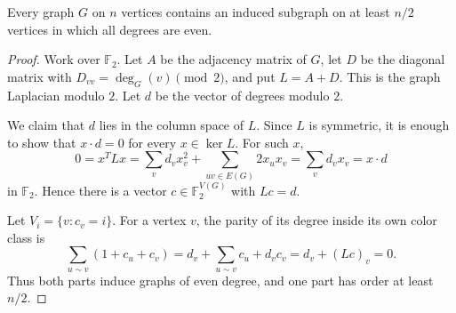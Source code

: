 \documentclass[10pt,a4paper]{amsart}
\newcommand{\F}{\mathbb{F}}
\begin{document}
\begin{lemma}\label{lem:parity}
Every graph \(G\) on \(n\) vertices contains an induced subgraph on at least \(n/2\) vertices in which all degrees are even.
\end{lemma}

\begin{proof}
Work over \(\F_2\).  Let \(A\) be the adjacency matrix of \(G\), let \(D\) be the diagonal matrix with \(D_{vv}=\deg_G(v)\pmod 2\), and put \(L=A+D\).  This is the graph Laplacian modulo \(2\).  Let \(d\) be the vector of degrees modulo \(2\).

We claim that \(d\) lies in the column space of \(L\).  Since \(L\) is symmetric, it is enough to show that \(x\cdot d=0\) for every \(x\in\ker L\).  For such \(x\),
\[
        0=x^T Lx
        =\sum_v d_vx_v^2+\sum_{uv\in E(G)}2x_ux_v
        =\sum_v d_vx_v
        =x\cdot d
\]
in \(\F_2\).  Hence there is a vector \(c\in \F_2^{V(G)}\) with \(Lc=d\).

Let \(V_i=\{v:c_v=i\}\).  For a vertex \(v\), the parity of its degree inside its own color class is
\[
        \sum_{u\sim v}(1+c_u+c_v)
        =d_v+\sum_{u\sim v}c_u+d_vc_v
        =d_v+(Lc)_v
        =0.
\]
Thus both parts induce graphs of even degree, and one part has order at least \(n/2\).
\end{proof}
\end{document}
